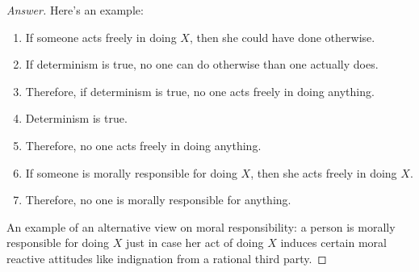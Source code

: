 \documentclass[11pt]{article}
\theoremstyle{definition}
\begin{document}
\begin{proof}[Answer]
Here's an example:
\begin{enumerate}
\item If someone acts freely in doing $X$, then she could have done otherwise.
\item If determinism is true, no one can do otherwise than one actually does.
\item Therefore, if determinism is true, no one acts freely in doing anything.
\item Determinism is true.
\item Therefore, no one acts freely in doing anything.
\item If someone is morally responsible for doing $X$, then she acts freely in doing $X$.
\item Therefore, no one is morally responsible for anything.
\end{enumerate}

An example of an alternative view on moral responsibility: a person is morally responsible for doing $X$ just in case her act of doing $X$ induces certain moral reactive attitudes like indignation from a rational third party.

\end{proof}
\end{document}
